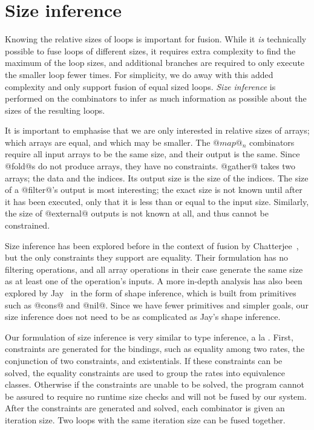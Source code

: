 \section{Size inference}

Knowing the relative sizes of loops is important for fusion.
While it \emph{is} technically possible to fuse loops of different sizes, it requires extra complexity to find the maximum of the loop sizes, and additional branches are required to only execute the smaller loop fewer times. For simplicity, we do away with this added complexity and only support fusion of equal sized loops. \emph{Size inference} is performed on the combinators to infer as much information as possible about the sizes of the resulting loops.

It is important to emphasise that we are only interested in relative sizes of arrays; which arrays are equal, and which may be smaller.
The $@map@_n$ combinators require all input arrays to be the same size, and their output is the same.
Since @fold@s do not produce arrays, they have no constraints.
@gather@ takes two arrays; the data and the indices. Its output size is the size of the indices.
The size of a @filter@'s output is most interesting; the exact size is not known until after it has been executed, only that it is less than or equal to the input size.
Similarly, the size of @external@ outputs is not known at all, and thus cannot be constrained.

Size inference has been explored before in the context of fusion by Chatterjee~\cite{chatterjee1991size}, but the only constraints they support are equality.
Their formulation has no filtering operations, and all array operations in their case generate the same size as at least one of the operation's inputs.
A more in-depth analysis has also been explored by Jay~\cite{jay1996shape} in the form of shape inference, which is built from primitives such as @cons@ and @nil@.
Since we have fewer primitives and simpler goals, our size inference does not need to be as complicated as Jay's shape inference.


Our formulation of size inference is very similar to type inference, a la \CITE.
First, constraints are generated for the bindings, such as equality among two rates, the conjunction of two constraints, and existentials.
If these constraints can be solved, the equality constraints are used to group the rates into equivalence classes.
Otherwise if the constraints are unable to be solved, the program cannot be assured to require no runtime size checks and will not be fused by our system.
After the constraints are generated and solved, each combinator is given an iteration size.
Two loops with the same iteration size can be fused together.

